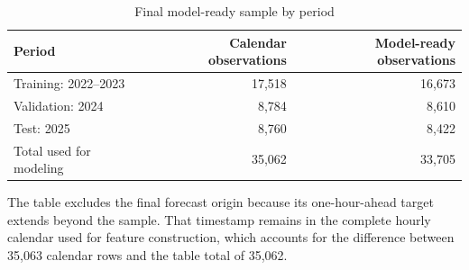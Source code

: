 \begin{table}[H]
\centering
\caption{Final model-ready sample by period}
\label{tab:model-sample}
\begin{tabular}{lrr}
\toprule
Period & Calendar observations & Model-ready observations \\
\midrule
Training: 2022--2023 & 17,518 & 16,673 \\
Validation: 2024 & 8,784 & 8,610 \\
Test: 2025 & 8,760 & 8,422 \\
\midrule
Total used for modeling & 35,062 & 33,705 \\
\bottomrule
\end{tabular}
\end{table}

The table excludes the final forecast origin because its
one-hour-ahead target extends beyond the sample. That timestamp
remains in the complete hourly calendar used for feature
construction, which accounts for the difference between
35,063 calendar rows and the table total of 35,062.
